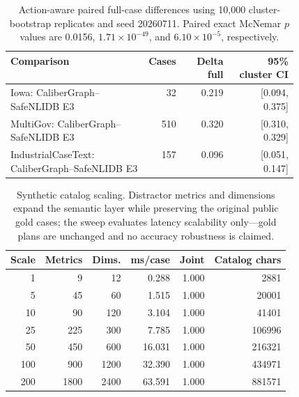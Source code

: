 \documentclass[letterpaper]{article}
\begin{document}
\begin{table}[t]
\centering
\scriptsize
\setlength{\tabcolsep}{2pt}
\begin{tabular}{@{}>{\raggedright\arraybackslash}p{0.48\linewidth}rrr@{}}
\toprule
Comparison & Cases & Delta full & 95\% cluster CI \\
\midrule
Iowa: CaliberGraph--SafeNLIDB E3 & 32 & 0.219 & [0.094, 0.375] \\
MultiGov: CaliberGraph--SafeNLIDB E3 & 510 & 0.320 & [0.310, 0.329] \\
IndustrialCaseText: CaliberGraph--SafeNLIDB E3 & 157 & 0.096 & [0.051, 0.147] \\
\bottomrule
\end{tabular}
\caption{Action-aware paired full-case differences using 10,000 cluster-bootstrap replicates and seed 20260711. Paired exact McNemar $p$ values are 0.0156, $1.71\times10^{-49}$, and $6.10\times10^{-5}$, respectively.}
\end{table}

\begin{table}[t]
\centering
\scriptsize
\begin{tabular}{rrrrrr}
\toprule
Scale & Metrics & Dims. & ms/case & Joint & Catalog chars \\
\midrule
1 & 9 & 12 & 0.288 & 1.000 & 2881 \\
5 & 45 & 60 & 1.515 & 1.000 & 20001 \\
10 & 90 & 120 & 3.104 & 1.000 & 41401 \\
25 & 225 & 300 & 7.785 & 1.000 & 106996 \\
50 & 450 & 600 & 16.031 & 1.000 & 216321 \\
100 & 900 & 1200 & 32.390 & 1.000 & 434971 \\
200 & 1800 & 2400 & 63.591 & 1.000 & 881571 \\
\bottomrule
\end{tabular}
\caption{Synthetic catalog scaling. Distractor metrics and dimensions expand the semantic layer while preserving the original public gold cases; the sweep evaluates latency scalability only---gold plans are unchanged and no accuracy robustness is claimed.}
\end{table}
\end{document}

